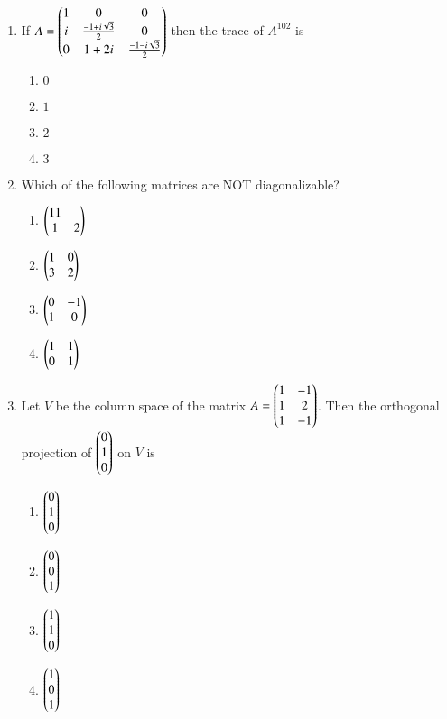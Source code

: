 \documentclass[journal]{IEEEtran}
\begin{document}
\begin{enumerate}
{\begin{multicols}{4}
\begin{enumerate}
\item $\alpha=\frac{2}{3},\beta=1$
\item $\alpha=1,\beta=\frac{2}{3}$
\end{enumerate}
\end{multicols}
}
\item{
If $A=\begin{pmatrix}1&0&0\\i&\frac{-1+i\sqrt{3}}{2}&0\\0&1+2i&\frac{-1-i\sqrt{3}}{2}\end{pmatrix}$ then the trace of $A^{102}$ is 
\begin{multicols}{4}
\begin{enumerate}
\item $0$
\item $1$
\item $2$
\item $3$
\end{enumerate}
\end{multicols}
}
\item{
Which of the following matrices are NOT diagonalizable?
\begin{multicols}{4}
\begin{enumerate}
\item $\begin{pmatrix}11\\1&2\end{pmatrix}$
\item $\begin{pmatrix}1&0\\3&2\end{pmatrix}$
\item $\begin{pmatrix}0&-1\\1&0\end{pmatrix}$ 
\item $\begin{pmatrix}1&1\\0&1\end{pmatrix}$
\end{enumerate}
\end{multicols}
}
\item{
Let $V$ be the column space of the matrix $A=\begin{pmatrix}1&-1\\1&2\\1&-1\end{pmatrix}$. Then the orthogonal projection of $\begin{pmatrix}0\\1\\0\end{pmatrix}$ on $V$ is
\begin{multicols}{4}
\begin{enumerate}
\item $\begin{pmatrix}0\\1\\0\end{pmatrix}$
\item $\begin{pmatrix}0\\0\\1\end{pmatrix}$
\item $\begin{pmatrix}1\\1\\0\end{pmatrix}$
\item $\begin{pmatrix}1\\0\\1\end{pmatrix}$

\end{enumerate}
\end{multicols}}
\end{enumerate}
\end{document}
